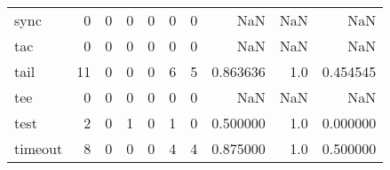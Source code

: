 \begin{tabular}{lrrrrrrrrr}
sync      &                                       0 &                                                  0 &                                                  0 &                                                  0 &                                                  0 &                                                  0 &                                                NaN &                                    NaN &                                  NaN \\
tac       &                                       0 &                                                  0 &                                                  0 &                                                  0 &                                                  0 &                                                  0 &                                                NaN &                                    NaN &                                  NaN \\
tail      &                                      11 &                                                  0 &                                                  0 &                                                  0 &                                                  6 &                                                  5 &                                           0.863636 &                                    1.0 &                             0.454545 \\
tee       &                                       0 &                                                  0 &                                                  0 &                                                  0 &                                                  0 &                                                  0 &                                                NaN &                                    NaN &                                  NaN \\
test      &                                       2 &                                                  0 &                                                  1 &                                                  0 &                                                  1 &                                                  0 &                                           0.500000 &                                    1.0 &                             0.000000 \\
timeout   &                                       8 &                                                  0 &                                                  0 &                                                  0 &                                                  4 &                                                  4 &                                           0.875000 &                                    1.0 &                             0.500000 \\

\end{tabular}
